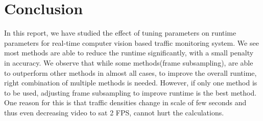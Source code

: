 \documentclass[conference]{IEEEtran}
\begin{document}

\section{Conclusion}

In this report, we have studied the effect of tuning parameters on runtime parameters for real-time computer vision based traffic monitoring system.
We see most methods are able to reduce the runtime significantly, with a small penalty in accuracy.
We observe that while some methods(frame subsampling), are able to outperform other methods in almost all cases, to improve the overall runtime, right combination of multiple methods is needed.
However, if only one method is to be used, adjusting frame subsampling to improve runtime is the best method. One reason for this is that traffic densities change in scale of few seconds and thus even decreasing video to sat 2 FPS, cannot hurt the calculations.





\end{document}
